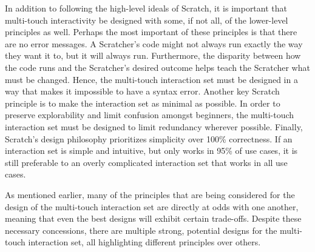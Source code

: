 In addition to following the high-level ideals of Scratch, it is important that multi-touch interactivity be designed with some, if not all, of the lower-level principles as well. Perhaps the most important of these principles is that there are no error messages. A Scratcher's code might not always run exactly the way they want it to, but it will always run. Furthermore, the disparity between how the code runs and the Scratcher's desired outcome helps teach the Scratcher what must be changed. Hence, the multi-touch interaction set must be designed in a way that makes it impossible to have a syntax error. Another key Scratch principle is to make the interaction set as minimal as possible. In order to preserve explorability and limit confusion amongst beginners, the multi-touch interaction set must be designed to limit redundancy wherever possible. Finally, Scratch's design philosophy prioritizes simplicity over 100\% correctness. If an interaction set is simple and intuitive, but only works in 95\% of use cases, it is still preferable to an overly complicated interaction set that works in all use cases.

As mentioned earlier, many of the principles that are being considered for the design of the multi-touch interaction set are directly at odds with one another, meaning that even the best designs will exhibit certain trade-offs. Despite these necessary concessions, there are multiple strong, potential designs for the multi-touch interaction set, all highlighting different principles over others.
